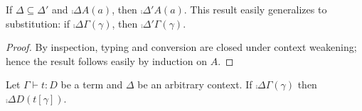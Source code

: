 \documentclass[a4paper]{article}
\begin{document}
\begin{lemma}\label{thm:0001}
  If $\Delta \subseteq \Delta'$ and $\comp{\Delta}{A}(a)$, then $\comp{\Delta'}{A}(a)$.
  This result easily generalizes to substitution: if $\comp{\Delta}{\Gamma}(\gamma)$, then $\comp{\Delta'}{\Gamma}(\gamma)$.
\end{lemma}
\begin{proof}
  By inspection, typing and conversion are closed under context weakening; hence the result follows easily by induction on $A$.
\end{proof}

\begin{theorem}
  Let $\Gamma \vdash t : D$ be a term and $\Delta$ be an arbitrary context.
  If $\comp{\Delta}{\Gamma}(\gamma)$ then $\comp{\Delta}{D}(t[\gamma])$.
\end{theorem}
\end{document}
